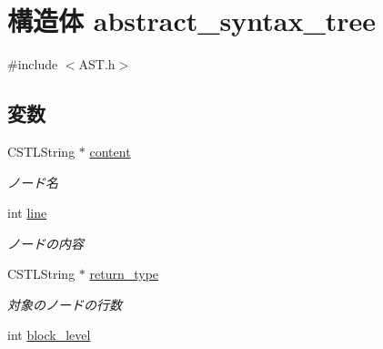 \hypertarget{structabstract__syntax__tree}{
\section{構造体 abstract\_\-syntax\_\-tree}
\label{structabstract__syntax__tree}
}


{\ttfamily \#include $<$AST.h$>$}

\subsection*{変数}
\begin{DoxyCompactItemize}
\item 
\hypertarget{structabstract__syntax__tree_a1d3ebb923055b39ec93220a82010c9a5}{
CSTLString $\ast$ \hyperlink{structabstract__syntax__tree_a1d3ebb923055b39ec93220a82010c9a5}{content}}
\label{structabstract__syntax__tree_a1d3ebb923055b39ec93220a82010c9a5}

\begin{DoxyCompactList}\small\item\em ノード名 \item\end{DoxyCompactList}\item 
\hypertarget{structabstract__syntax__tree_a16de2988d91f99ee9324a8e27e59314a}{
int \hyperlink{structabstract__syntax__tree_a16de2988d91f99ee9324a8e27e59314a}{line}}
\label{structabstract__syntax__tree_a16de2988d91f99ee9324a8e27e59314a}

\begin{DoxyCompactList}\small\item\em ノードの内容 \item\end{DoxyCompactList}\item 
\hypertarget{structabstract__syntax__tree_a427a4655976ce8284a3197e9d9a9b856}{
CSTLString $\ast$ \hyperlink{structabstract__syntax__tree_a427a4655976ce8284a3197e9d9a9b856}{return\_\-type}}
\label{structabstract__syntax__tree_a427a4655976ce8284a3197e9d9a9b856}

\begin{DoxyCompactList}\small\item\em 対象のノードの行数 \item\end{DoxyCompactList}\item 
\hypertarget{structabstract__syntax__tree_a9da95b72b69ccebafe64a6cdff6735b1}{
int \hyperlink{structabstract__syntax__tree_a9da95b72b69ccebafe64a6cdff6735b1}{block\_\-level}}
\label{structabstract__syntax__tree_a9da95b72b69ccebafe64a6cdff6735b1}


\end{DoxyCompactItemize}
